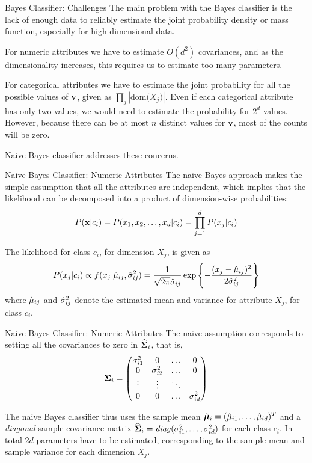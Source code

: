   \begin{frame}{Bayes Classifier: Challenges}
The main problem with the Bayes classif\/{i}er is the lack of enough
data to reliably estimate the joint probability density or mass
function, especially for high-dimensional data. 

\bigskip
For
numeric attributes we have to estimate $O(d^2)$ covariances, and
as the dimensionality increases, this requires us to estimate too
many parameters. 

\medskip
For categorical attributes we have to estimate
the joint probability for all the possible values of $\mathbf{v}$, given
as $\prod_{j} |\text{dom}\bigl(X_{j}\bigr)|$. Even if each categorical attribute
has only two values, we would need to estimate the probability for
$2^d$ values. However, because there can be at most $n$ distinct
values for $\mathbf{v}$, most of the counts will be zero. 

\medskip
Naive Bayes classifier addresses these concerns.
\end{frame}


\begin{frame}{Naive Bayes Classif\/{i}er: Numeric Attributes}
The naive Bayes approach makes the simple assumption
that all the attributes are independent, which
implies that the likelihood
can be decomposed into a product of dimension-wise probabilities:
\begin{align*}
P(\mathbf{x} | c_i) = P(x_1,x_2,\ldots,x_d | c_i) = \prod_{j=1}^d P(x_{j} |
c_i) 
\end{align*}

 The
likelihood for class $c_i$, for dimension $X_{j}$, is given as
\begin{align*}
    P(x_{j}|c_i) \propto f(x_{j} | \hat{\mu}_{ij}, \hat{\sigma}_{ij}^2)  = {1\over
    \sqrt{2\pi}\hat{\sigma}_{ij}}\exp\left\{ -{(x_{j} - \hat{\mu}_{ij})^2 \over
    2\hat{\sigma}_{ij}^2}\right\}
\end{align*}
where $\hat{\mu}_{ij}$ and
$\hat{\sigma}_{ij}^2$ denote the estimated
mean and variance for attribute $X_{j}$,
for class $c_i$.
\end{frame}


\begin{frame}{Naive Bayes Classif\/{i}er: Numeric Attributes}
The naive assumption corresponds to setting all the
covariances to zero in $\widehat{{\bm \Sigma}}_i$, that is,
\begin{align*}
  \cov_i = \matr{
      \sigma_{i1}^2 & 0 & \ldots & 0\\
      0 & \sigma_{i2}^2 & \ldots & 0\\
      \vdots & \vdots & \ddots\\
      0 &  0 & \ldots & \sigma_{id}^2}
\end{align*}

The naive Bayes classif\/{i}er thus 
uses the sample mean $\hat{{\bm \mu}}_i =
(\hat{\mu}_{i1}, \dots, \hat{\mu}_{id})^T$
and a {\em diagonal} sample covariance matrix $\widehat{{\bm \Sigma}}_i =
\mathit{diag}(\sigma_{i1}^2, \dots, \sigma_{id}^2)$
for each class $c_i$.
In total $2d$ parameters have to be estimated,
corresponding
to the sample mean and sample variance for each
dimension $X_{j}$.
\end{frame}




